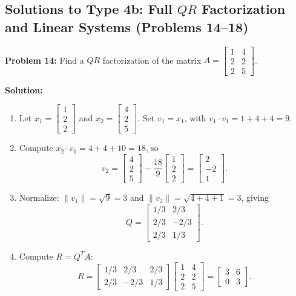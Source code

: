 \documentclass[11pt, letterpaper]{article}
\theoremstyle{definition}
\theoremstyle{remark}
\begin{document}
\subsection{Solutions to Type 4b: Full $QR$ Factorization and Linear Systems (Problems 14--18)}

\textbf{Problem 14:} Find a $QR$ factorization of the matrix $A = \begin{bmatrix} 1 & 4 \\ 2 & 2 \\ 2 & 5 \end{bmatrix}$.

\textbf{Solution:}
\begin{enumerate}[label=\textbf{Step \arabic*:}]
    \item Let $x_1 = \begin{bmatrix} 1 \\ 2 \\ 2 \end{bmatrix}$ and $x_2 = \begin{bmatrix} 4 \\ 2 \\ 5 \end{bmatrix}$. Set $v_1 = x_1$, with $v_1 \cdot v_1 = 1 + 4 + 4 = 9$.
    \item Compute $x_2 \cdot v_1 = 4 + 4 + 10 = 18$, so
    \[
        v_2 = \begin{bmatrix} 4 \\ 2 \\ 5 \end{bmatrix} - \frac{18}{9}\begin{bmatrix} 1 \\ 2 \\ 2 \end{bmatrix} = \begin{bmatrix} 2 \\ -2 \\ 1 \end{bmatrix}.
    \]
    \item Normalize: $\|v_1\| = \sqrt{9} = 3$ and $\|v_2\| = \sqrt{4 + 4 + 1} = 3$, giving
    \[
        Q = \begin{bmatrix} 1/3 & 2/3 \\ 2/3 & -2/3 \\ 2/3 & 1/3 \end{bmatrix}.
    \]
    \item Compute $R = Q^T A$:
    \[
        R = \begin{bmatrix} 1/3 & 2/3 & 2/3 \\ 2/3 & -2/3 & 1/3 \end{bmatrix} \begin{bmatrix} 1 & 4 \\ 2 & 2 \\ 2 & 5 \end{bmatrix} = \begin{bmatrix} 3 & 6 \\ 0 & 3 \end{bmatrix}.
    \]
\end{enumerate}
\end{document}
